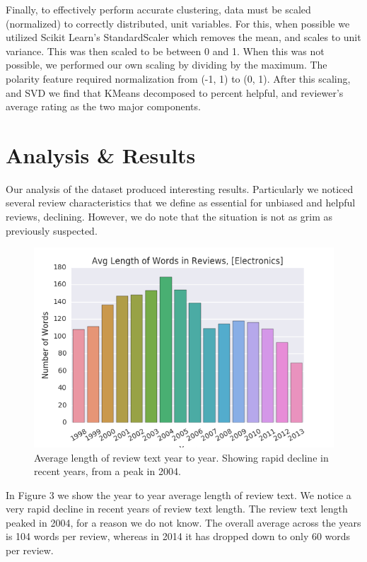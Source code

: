 \documentclass[journal, a4paper]{IEEEtran}
\begin{document}
Finally, to effectively perform accurate clustering, data must be scaled (normalized) to correctly distributed, unit variables. For this, when possible we utilized Scikit Learn's StandardScaler which removes the mean, and scales to unit variance. This was then scaled to be between 0 and 1. When this was not possible, we performed our own scaling by dividing by the maximum. The polarity feature required normalization from (-1, 1) to (0, 1). After this scaling, and SVD we find that KMeans decomposed to percent helpful, and reviewer's average rating as the two major components.


\section{Analysis \& Results}
Our analysis of the dataset produced interesting results. Particularly we noticed several review characteristics that we define as essential for unbiased and helpful reviews, declining. However, we do note that the situation is not as grim as previously suspected.

\begin{figure}[!hbt]
    \begin{center}
    \includegraphics[width=\columnwidth]{avg_length_of_words.png}
    \caption{Average length of review text year to year. Showing rapid decline in recent years, from a peak in 2004.}
    \end{center}
\end{figure}

In Figure 3 we show the year to year average length of review text. We notice a very rapid decline in recent years of review text length. The review text length peaked in 2004, for a reason we do not know. The overall average across the years is 104 words per review, whereas in 2014 it has dropped down to only 60 words per review.
\end{document}
